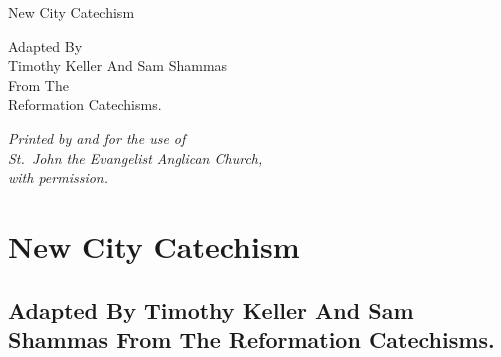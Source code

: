 





\pagestyle{empty}

\vfill

\begin{center}
	\begin{minipage}{2.9in}
	{\centering
	\Huge{New City Catechism}
	\par}
	\end{minipage}
\end{center}

\vfill

\begin{center}
	\begin{minipage}{2.9in}
	{\centering
	Adapted By\\
	Timothy Keller And Sam Shammas\\
	From The\\
	Reformation Catechisms.\par}
	\end{minipage}
\end{center}

\vfill

\begin{center}
	\begin{minipage}{2.9in}
	\begin{center}
	{\em Printed by and for the use of\\ St.\ John the Evangelist Anglican Church,\\ with permission.}
	\end{center}
	\end{minipage}
\end{center}

\vfill

\cleardoublepage

\pagestyle{plain}

\chapter*{New City Catechism}

\section*{Adapted By Timothy Keller And Sam Shammas From The Reformation Catechisms.}

